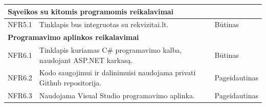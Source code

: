 \documentclass{VUMIFPSkursinis}
\begin{document}
\begin{table}[H]
\begin{tabular}{|p{2cm}|p{10cm}|p{3cm}|}
\multicolumn{3}{|l|}{\textbf{Sąveikos su kitomis programomis reikalavimai}} \\ \hline
NFR5.1 & \multicolumn{1}{m{10cm}|}{Tinklapis bus integruotas su rekvizitai.lt.} & Būtinas \\ \hline
\multicolumn{3}{|l|}{\textbf{Programavimo aplinkos reikalavimai}} \\ \hline
NFR6.1 & \multicolumn{1}{m{10cm}|}{Tinklapis kuriamas C\# programavimo kalba, naudojant ASP.NET karkasą.} & Būtinas \\ \hline
NFR6.2 & \multicolumn{1}{m{10cm}|}{Kodo saugojimui ir dalinimuisi naudojama privati Github repositorija.} & Pageidautinas \\ \hline
NFR6.3 & \multicolumn{1}{m{10cm}|}{Naudojama Visual Studio programavimo aplinka.} & Pageidautinas \\ \hline
\end{tabular}
\end{table}
\end{document}
